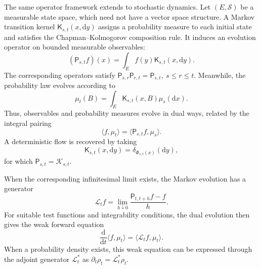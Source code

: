 \documentclass[12pt,a4paper,oneside]{book}
\begin{document}
The same operator framework extends to stochastic dynamics. Let $(E,\mathcal S)$ be a measurable state space, which need
not have a vector space structure. A Markov transition kernel $\mathsf K_{s,t}(x,\mathrm dy)$ assigns a probability measure
to each initial state and satisfies the Chapman--Kolmogorov composition rule. It induces an evolution operator on bounded
measurable observables:
\begin{equation*}
    (\mathsf P_{s,t}f)(x) = \int_E f(y)\mathsf K_{s,t}(x,\mathrm dy).
\end{equation*}
The corresponding operators satisfy $\mathsf P_{s,r}\mathsf P_{r,t} = \mathsf P_{s,t},\ s\leq r\leq t$. Meanwhile, the
probability law evolves according to
\begin{equation*}
    \mu_t(B) = \int_E\mathsf K_{s,t}(x,B)\mu_s(\mathrm dx).
\end{equation*}
Thus, observables and probability measures evolve in dual ways, related by the integral pairing
\begin{equation*}
    \langle f,\mu_t\rangle = \langle\mathsf P_{s,t}f,\mu_s\rangle.
\end{equation*}
A deterministic flow is recovered by taking
\begin{equation*}
   \mathsf K_{s,t}(x,\mathrm dy) = \delta_{\Phi_{s,t}(x)}(\mathrm dy),
\end{equation*}
for which $\mathsf P_{s,t}=\mathcal{K}_{s,t}$.

When the corresponding infinitesimal limit exists, the Markov evolution has a generator
\begin{equation*}
    \mathcal L_t f = \lim_{h\downarrow0} \frac{\mathsf P_{t,t+h}f-f}{h}.
\end{equation*}
For suitable test functions and integrability conditions, the dual
evolution then gives the weak forward equation
\begin{equation*}
    \frac{\mathrm d}{\mathrm dt}\langle f,\mu_t\rangle = \langle\mathcal L_t f,\mu_t\rangle.
\end{equation*}
When a probability density exists, this weak equation can be expressed through the adjoint generator $\mathcal L_t^*$ as
$\partial_t\rho_t=\mathcal L_t^*\rho_t$.
\end{document}
